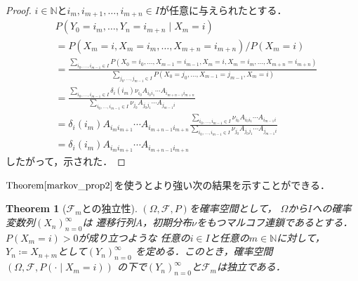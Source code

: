 \documentclass[dvipdfmx,autodetect-engine]{jsarticle}
\newtheorem{theorem}{Theorem}[section]
\theoremstyle{remark}
\theoremstyle{definition}
\newcommand{\N}{\mathbb{N}}
\begin{document}
\begin{proof}
    $i \in \N$と$i_m,i_{m+1},\ldots,i_{m+n} \in I$が任意に与えられたとする．
    \begin{align}
        &P(Y_0 = i_m ,\ldots, Y_n = i_{m+n} \mid X_m = i) \\
        &= P(X_m = i,X_m = i_m,\ldots,X_{m+n}=i_{m+n}) / P(X_m = i) \\
        &= \frac{\sum_{i_0,\ldots,i_{m-1} \in I} P(X_0 = i_0,\ldots, 
        X_{m-1} = i_{m-1},X_m = i,X_m = i_m,\ldots,X_{m+n}=i_{m+n})}{\sum_{j_0,\ldots,j_{m-1} 
        \in I} P(X_0 = j_0,\ldots, X_{m-1} = j_{m-1},X_m = i)}\\
        &= \frac{\sum_{i_0,\ldots,i_{m-1} \in I} \delta_{i}(i_m) 
         \nu_{i_0} A_{i_0 i_1} \cdots A_{i_{m+n-1}{i_{m+n}}}}{\sum_{i_0,\ldots,i_{m-1} \in I} 
         \nu_{j_0} A_{j_0 j_1} \cdots A_{j_{m-1} i}} \\
        &= \delta_{i}(i_m) A_{i_{m} i_{m+1}} \cdots A_{i_{m+n-1} i_{m+n}} \frac{\sum_{i_0,\ldots,i_{m-1} \in I} 
        \nu_{i_0} A_{i_0 i_1} \cdots A_{i_{m-1} i}}{\sum_{i_0,\ldots,i_{m-1} \in I} 
        \nu_{j_0} A_{j_0 j_1} \cdots A_{j_{m-1} i}} \\
        &= \delta_{i}(i_m) A_{i_{m} i_{m+1}} \cdots A_{i_{m+n-1} i_{m+n}}
    \end{align}
    したがって，示された．
\end{proof}

$\mathrm{Theorem}\ref{markov_prop2}$を使うとより強い次の結果を示すことができる．
\begin{theorem}[$\mathcal{F}_{m}$との独立性]
    $(\Omega,\mathcal{F},P)$を確率空間として，
    $\Omega$から$I$への確率変数列$(X_n)_{n=0}^{\infty}$は
    遷移行列$A$，初期分布$\nu$をもつマルコフ連鎖であるとする．
    $P(X_m = i) >0$が成り立つような
    任意の$i \in I$と任意の$m \in \N$に対して，
    $Y_n \coloneqq X_{n+m}$として$(Y_n)_{n=0}^{\infty}$
    を定める．このとき，確率空間$(\Omega,\mathcal{F},P(\cdot \mid X_m = i))$
    の下で$(Y_n)_{n=0}^{\infty}$と$\mathcal{F}_m$は独立である．
\end{theorem}
\end{document}
